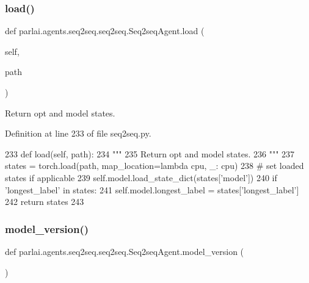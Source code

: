 \subsubsection{\texorpdfstring{load()}{load()}}
{\footnotesize\ttfamily def parlai.\+agents.\+seq2seq.\+seq2seq.\+Seq2seq\+Agent.\+load (\begin{DoxyParamCaption}\item[{}]{self,  }\item[{}]{path }\end{DoxyParamCaption})}

\begin{DoxyVerb}Return opt and model states.
\end{DoxyVerb}
 

Definition at line 233 of file seq2seq.\+py.


\begin{DoxyCode}
233     \textcolor{keyword}{def }load(self, path):
234         \textcolor{stringliteral}{"""}
235 \textcolor{stringliteral}{        Return opt and model states.}
236 \textcolor{stringliteral}{        """}
237         states = torch.load(path, map\_location=\textcolor{keyword}{lambda} cpu, \_: cpu)
238         \textcolor{comment}{# set loaded states if applicable}
239         self.model.load\_state\_dict(states[\textcolor{stringliteral}{'model'}])
240         \textcolor{keywordflow}{if} \textcolor{stringliteral}{'longest\_label'} \textcolor{keywordflow}{in} states:
241             self.model.longest\_label = states[\textcolor{stringliteral}{'longest\_label'}]
242         \textcolor{keywordflow}{return} states
243 
\end{DoxyCode}
\mbox{\label{classparlai_1_1agents_1_1seq2seq_1_1seq2seq_1_1Seq2seqAgent_aba4b52b4f15795eeda202cb303525483}} 
\subsubsection{\texorpdfstring{model\+\_\+version()}{model\_version()}}
{\footnotesize\ttfamily def parlai.\+agents.\+seq2seq.\+seq2seq.\+Seq2seq\+Agent.\+model\+\_\+version (\begin{DoxyParamCaption}{ }\end{DoxyParamCaption})\hspace{0.3cm}{\ttfamily [static]}}

